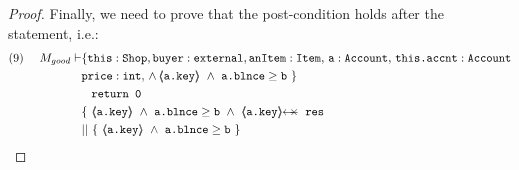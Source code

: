 \begin{proof}
Finally, we need to prove that the post-condition holds after the  statement, i.e.:
\small
\begin{align*}
\text{(9)}  \ \ \ \ M_{good} \vdash & \{  \prg{this}:\prg{Shop}, \prg{buyer} : \prg{external}, \prg{anItem} : \prg{Item},\, \prg{a}:\prg{Account},\, \prg{this.accnt}:\prg{Account}\\
				& \prg{price} : \prg{int},\,
				  \wedge\, 
				  \inside{\prg{a.key}}\ \wedge\ {\prg{a.blnce} \geq \prg{b}}\ \}\\
		  		&\;\;\; \prg{return 0}\ \\  
		& \{\ {\inside{\prg{a.key}}\ \wedge\ {\prg{a.blnce} \geq \prg{b}}}\ 
		\wedge\ {\protectedFrom{\prg{a.key}}{\prg{res}}}\ \\
		& ||\ \{\ {\inside{\prg{a.key}}\ \wedge\ 
							 {\prg{a.blnce} \geq \prg{b}}}\ \}
\end{align*}
\normalsize
{}



\end{proof}
